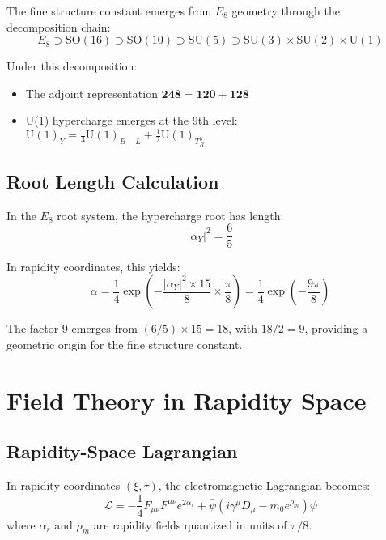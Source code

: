 \documentclass[12pt,a4paper]{article}
\begin{document}
The fine structure constant emerges from $E_{8}$ geometry through the decomposition chain:
\begin{equation}
E_8 \supset \text{SO}(16) \supset \text{SO}(10) \supset \text{SU}(5) \supset \text{SU}(3) \times \text{SU}(2) \times \text{U}(1)
\end{equation}

Under this decomposition:
\begin{itemize}
\item The adjoint representation $\mathbf{248} = \mathbf{120} + \mathbf{128}$
\item U(1) hypercharge emerges at the 9th level: $\text{U}(1)_Y = \frac{1}{3}\text{U}(1)_{B-L} + \frac{1}{2}\text{U}(1)_{T^3_R}$
\end{itemize}

\subsection{Root Length Calculation}

In the $E_{8}$ root system, the hypercharge root has length:
\begin{equation}
|\alpha_Y|^2 = \frac{6}{5}
\end{equation}

In rapidity coordinates, this yields:
\begin{equation}
\alpha = \frac{1}{4} \exp\left(-\frac{|\alpha_Y|^2 \times 15}{8} \times \frac{\pi}{8}\right) = \frac{1}{4} \exp\left(-\frac{9\pi}{8}\right)
\end{equation}

The factor 9 emerges from $(6/5) \times 15 = 18$, with $18/2 = 9$, providing a geometric origin for the fine structure constant.

\section{Field Theory in Rapidity Space}

\subsection{Rapidity-Space Lagrangian}

In rapidity coordinates $(\xi, \tau)$, the electromagnetic Lagrangian becomes:
\begin{equation}
\mathcal{L} = -\frac{1}{4}F_{\mu\nu}F^{\mu\nu}e^{2\alpha_r} + \bar{\psi}(i\gamma^{\mu} D_{\mu} - m_0 e^{\rho_m})\psi
\end{equation}
where $\alpha_r$ and $\rho_m$ are rapidity fields quantized in units of $\pi/8$.
\end{document}
